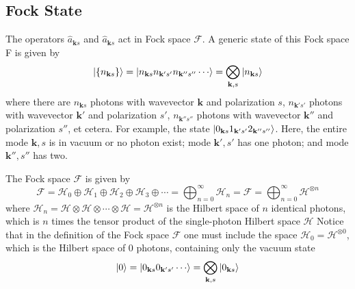 \documentclass[../../../main.tex]{subfiles}
\begin{document}
\subsection{Fock State}
The operators $\hat{a}_{\mathbf{k }s }$ and $\hat{a }_{\mathbf{k }s}$ act in Fock space $\mathcal{F}$.
A generic state of this Fock space F is given by
\begin{equation*}
  \ket{\left\{ n_{\mathbf{k }s} \right\} }
  = \ket{n_{\mathbf{k} s}n_{\mathbf{k}'s'}n_{\mathbf{k}''s''} \cdots }
  =\bigotimes_{\mathbf{k },s} \ket{n_{\mathbf{k }s}}
\end{equation*}
where there are \( n_{\mathbf{k} s} \) photons with wavevector \( \mathbf{k} \) and polarization \( s \), \( n_{\mathbf{k}'s'} \) photons with wavevector \( \mathbf{k}' \) and polarization \( s' \), \( n_{\mathbf{k}''s''} \) photons with wavevector \( \mathbf{k}'' \) and polarization \( s'' \), et cetera.
For example, the state $\ket{ 0_{\mathbf{k} s} 1_{\mathbf{k}'s'}  2_{\mathbf{k}''s''}}$.
Here, the entire mode $\mathbf{k},s$ is in vacuum or no photon exist; mode $\mathbf{k'},s'$ has one photon; and mode $\mathbf{k}'',s''$ has two.

The Fock space \( \mathcal{F} \) is given by
\begin{equation*}
  \mathcal{F} = \mathcal{H}_0 \oplus \mathcal{H}_1 \oplus \mathcal{H}_2 \oplus \mathcal{H}_3 \oplus \cdots = \bigoplus_{n=0}^{\infty} \mathcal{H}_n = \mathcal{F} = \bigoplus_{n=0}^{\infty} \mathcal{H}^{\otimes n}
\end{equation*}
where $  \mathcal{H}_n = \mathcal{H} \otimes \mathcal{H} \otimes \cdots \otimes \mathcal{H} = \mathcal{H}^{\otimes n}$ is the Hilbert space of $n$ identical photons, which is $n$ times the tensor product of the single-photon Hilbert space $\mathcal{H}$
Notice that in the definition of the Fock space $\mathcal{F}$ one must include the space $\mathcal{H}_0 = \mathcal{H}^{\otimes 0}$, which is the Hilbert space of 0 photons, containing only the vacuum state
\begin{equation*}
  \ket{0}
  = \ket{0_{\mathbf{k} s}0_{\mathbf{k}'s'}\cdots }
  =\bigotimes_{\mathbf{k },s} \ket{0_{\mathbf{k }s}}
\end{equation*}
\end{document}
